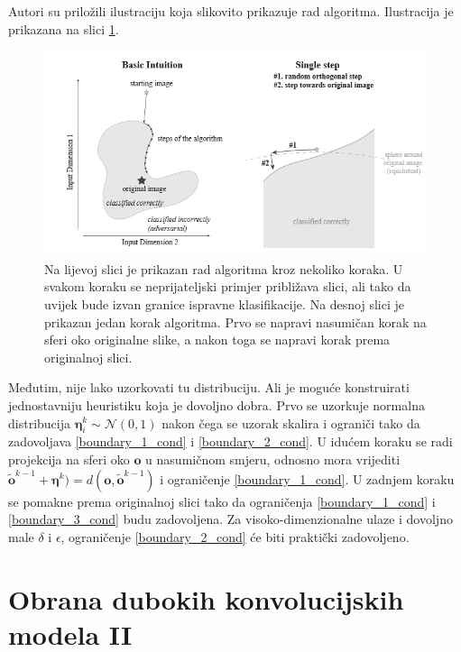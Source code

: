 \documentclass[utf8, diplomski]{fer}
\begin{document}
Autori su priložili ilustraciju koja slikovito prikazuje rad algoritma. Ilustracija je prikazana na slici \ref{fig:boundary_intuition}.


\begin{figure}[H]
\centering
\includegraphics[width=1.0\textwidth,keepaspectratio]{img/other/boundary_intuition.png}
\caption{Na lijevoj slici je prikazan rad algoritma kroz nekoliko koraka. U svakom koraku se neprijateljski primjer približava slici, ali tako da uvijek bude izvan granice ispravne klasifikacije. Na desnoj slici je prikazan jedan korak algoritma. Prvo se napravi nasumičan korak na sferi oko originalne slike, a nakon toga se napravi korak prema originalnoj slici.}
\label{fig:boundary_intuition}
\end{figure}

Međutim, nije lako uzorkovati tu distribuciju. Ali je moguće konstruirati jednostavniju heuristiku koja je dovoljno dobra. Prvo se uzorkuje normalna distribucija $\boldsymbol{\eta}_{i}^{k} \sim \mathcal{N}(0, 1)$ nakon čega se uzorak skalira i ograniči tako da zadovoljava \ref{boundary_1_cond} i \ref{boundary_2_cond}. U idućem koraku se radi projekcija na sferi oko $\boldsymbol{o}$ u nasumičnom smjeru, odnosno mora vrijediti $\boldsymbol{\tilde{o}}^{k-1} + \boldsymbol{\eta}^{k}) = d(\boldsymbol{o}, \boldsymbol{\tilde{o}}^{k-1})$ i ograničenje \ref{boundary_1_cond}. U zadnjem koraku se pomakne prema originalnoj slici tako da ograničenja \ref{boundary_1_cond} i \ref{boundary_3_cond} budu zadovoljena. Za visoko-dimenzionalne ulaze i dovoljno male $\delta$ i $\epsilon$, ograničenje \ref{boundary_2_cond} će biti praktički zadovoljeno.

\chapter{Obrana dubokih konvolucijskih modela II}
\end{document}
